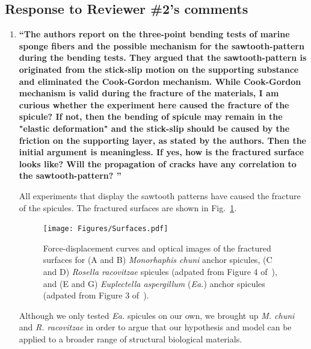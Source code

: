 \documentclass[11pt,letterpaper]{report}
\begin{document}
\begin{enumerate}[label=\textit{1.\arabic*},wide, labelwidth=!, labelindent=0pt]


\clearpage

\section*{Response to Reviewer \#2's comments}
\label{rev2}

\begin{enumerate}[label=\textit{2.\arabic*},wide, labelindent=0pt]

\item \label{r2c1}{\bf ``The authors report on the three-point bending tests of marine sponge fibers and the possible mechanism for the sawtooth-pattern during the bending tests. They argued that the sawtooth-pattern is originated from the stick-slip motion on the supporting substance and eliminated the Cook-Gordon mechanism.
While Cook-Gordon mechanism is valid during the fracture of the materials, I am curious whether the experiment here caused the fracture of the spicule?
If not, then the bending of spicule may remain in the "elastic deformation" and the stick-slip should be caused by the friction on the supporting layer, as stated by the authors. Then the initial argument is meaningless.
If yes, how is the fractured surface looks like? Will the propagation of cracks have any correlation to the sawtooth-pattern? ''}


All experiments that display the sawtooth patterns have caused the fracture of the spicules.
The fractured surfaces are shown in Fig.~\ref{fig:Surfaces}.

\begin{figure}[H]
\centering
\texttt{[image: Figures/Surfaces.pdf]}
\caption{Force-displacement curves and optical images of the fractured surfaces for (A and B) \textit{Monorhaphis chuni} anchor spicules, (C and D) \textit{Rosella racovitzae} spicules (adpated from Figure 4 of~\cite{kochiyama2021sawtooth}), and (E and G) \textit{Euplectella aspergillum} (\textit{Ea.}) anchor spicules (adpated from Figure 3 of~\cite{monn2017enhanced}).
}
\label{fig:Surfaces}
\end{figure}

Although we only tested \textit{Ea.} spicules on our own, we brought up \textit{M. chuni} and \textit{R. racovitzae} in order to argue that our hypothesis and model can be applied to a broader range of structural biological materials.


\end{enumerate}
\end{enumerate}
\end{document}
